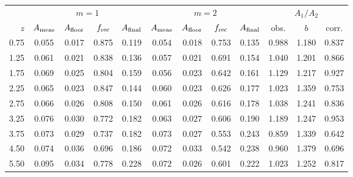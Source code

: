 \begin{tabular}{r|cccc|cccc|ccc}
\toprule
 & \multicolumn{4}{c|}{$m=1$} & \multicolumn{4}{c|}{$m=2$} & \multicolumn{3}{c}{$A_1/A_2$}\\
$z$ & $A_{\rm meas}$ & $A_{\rm floor}$ & $f_{\rm rec}$ & $A_{\rm final}$ & $A_{\rm meas}$ & $A_{\rm floor}$ & $f_{\rm rec}$ & $A_{\rm final}$ & obs. & $b$ & corr.\\
\midrule
0.75 & 0.055 & 0.017 & 0.875 & 0.119 & 0.054 & 0.018 & 0.753 & 0.135 & 0.988 & 1.180 & 0.837\\
1.25 & 0.061 & 0.021 & 0.838 & 0.136 & 0.057 & 0.021 & 0.691 & 0.154 & 1.040 & 1.201 & 0.866\\
1.75 & 0.069 & 0.025 & 0.804 & 0.159 & 0.056 & 0.023 & 0.642 & 0.161 & 1.129 & 1.217 & 0.927\\
2.25 & 0.065 & 0.023 & 0.847 & 0.144 & 0.060 & 0.023 & 0.626 & 0.177 & 1.023 & 1.359 & 0.753\\
2.75 & 0.066 & 0.026 & 0.808 & 0.150 & 0.061 & 0.026 & 0.616 & 0.178 & 1.038 & 1.241 & 0.836\\
3.25 & 0.076 & 0.030 & 0.772 & 0.182 & 0.063 & 0.027 & 0.606 & 0.190 & 1.189 & 1.247 & 0.953\\
3.75 & 0.073 & 0.029 & 0.737 & 0.182 & 0.073 & 0.027 & 0.553 & 0.243 & 0.859 & 1.339 & 0.642\\
4.50 & 0.074 & 0.036 & 0.696 & 0.186 & 0.072 & 0.033 & 0.542 & 0.238 & 0.960 & 1.379 & 0.696\\
5.50 & 0.095 & 0.034 & 0.778 & 0.228 & 0.072 & 0.026 & 0.601 & 0.222 & 1.023 & 1.252 & 0.817\\
\bottomrule
\end{tabular}
